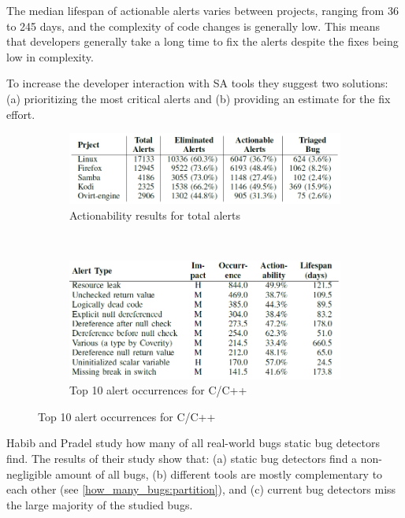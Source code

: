 \documentclass{article}
\begin{document}
 The median lifespan of actionable alerts varies between projects, ranging from 36 to 245 days, and the complexity of code changes is generally low. This means that developers generally take a long time to fix the alerts despite the fixes being low in complexity.

 To increase the developer interaction with SA tools they suggest two solutions: (a) prioritizing the most critical alerts and (b) providing an estimate for the fix effort.

 \begin{figure}[H]
     \begin{subfigure}{1\textwidth}
         \centering
         \includegraphics[scale=0.4]{./src/how_use_sa_actionable.png}
         \caption{Actionability results for total alerts}\label{how_use_sa:actionable}
     \end{subfigure}\\
     \begin{subfigure}{1\textwidth}
         \centering
         \includegraphics[scale=0.4]{./src/how_use_sa_topalerts.png}
         \caption{Top 10 alert occurrences for C/C++}\label{how_use_sa:top}
     \end{subfigure}
 \end{figure}


 Habib and Pradel \cite{how_many_bugs} study how many of all real-world bugs static bug detectors find. The results of their study show that: (a) static bug detectors find a non-negligible amount of all bugs, (b) different tools are mostly complementary to each other (see \cref{how_many_bugs:partition}), and (c) current bug detectors miss the large majority of the studied bugs.
\end{document}
